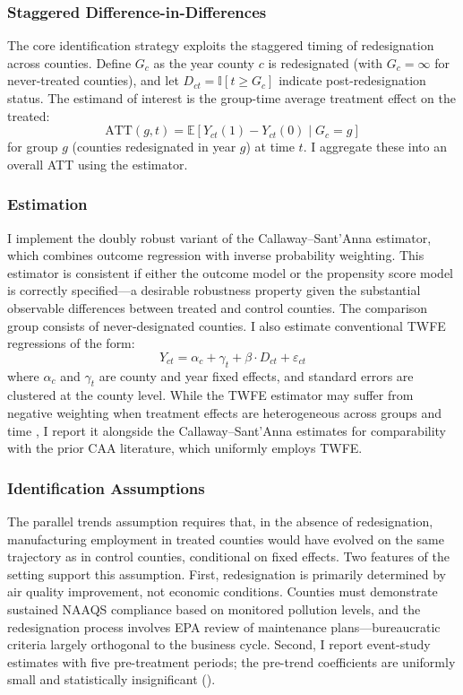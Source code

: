 \documentclass[12pt]{article}
\newcommand{\E}{\mathbb{E}}
\newcommand{\ind}{\mathbb{I}}
\begin{document}
\subsubsection*{Staggered Difference-in-Differences} The core identification strategy exploits the staggered timing of redesignation across counties. Define $G_c$ as the year county $c$ is redesignated (with $G_c = \infty$ for never-treated counties), and let $D_{ct} = \ind[t \geq G_c]$ indicate post-redesignation status. The estimand of interest is the group-time average treatment effect on the treated:
\begin{equation}
\text{ATT}(g, t) = \E[Y_{ct}(1) - Y_{ct}(0) \mid G_c = g]
\label{eq:att_gt}
\end{equation}
for group $g$ (counties redesignated in year $g$) at time $t$. I aggregate these into an overall ATT using the \citet{Callaway2021} estimator.

\subsubsection*{Estimation} I implement the doubly robust variant of the Callaway--Sant'Anna estimator, which combines outcome regression with inverse probability weighting. This estimator is consistent if either the outcome model or the propensity score model is correctly specified---a desirable robustness property given the substantial observable differences between treated and control counties. The comparison group consists of never-designated counties. I also estimate conventional TWFE regressions of the form:
\begin{equation}
Y_{ct} = \alpha_c + \gamma_t + \beta \cdot D_{ct} + \varepsilon_{ct}
\label{eq:twfe}
\end{equation}
where $\alpha_c$ and $\gamma_t$ are county and year fixed effects, and standard errors are clustered at the county level. While the TWFE estimator may suffer from negative weighting when treatment effects are heterogeneous across groups and time \citep{GoodmanBacon2021, deChaisemartin2020}, I report it alongside the Callaway--Sant'Anna estimates for comparability with the prior CAA literature, which uniformly employs TWFE.

\subsubsection*{Identification Assumptions} The parallel trends assumption requires that, in the absence of redesignation, manufacturing employment in treated counties would have evolved on the same trajectory as in control counties, conditional on fixed effects. Two features of the setting support this assumption. First, redesignation is primarily determined by air quality improvement, not economic conditions. Counties must demonstrate sustained NAAQS compliance based on monitored pollution levels, and the redesignation process involves EPA review of maintenance plans---bureaucratic criteria largely orthogonal to the business cycle. Second, I report event-study estimates with five pre-treatment periods; the pre-trend coefficients are uniformly small and statistically insignificant ().
\end{document}

